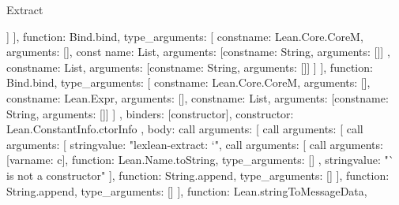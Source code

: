 \begin{lexlean}{Extract}
\begin{toolingmodule}
{{{{{{{{{{{{{{                                        }
                                      ]
                                    }
                                  }
                                ],
                                function: Bind.bind,
                                type_arguments: [
                                  const{name: Lean.Core.CoreM, arguments: []},
                                  const{
                                    name: List,
                                    arguments: [const{name: String, arguments: []}]
                                  },
                                  const{name: List, arguments: [const{name: String, arguments: []}]}
                                ]
                              }
                            }
                          ],
                          function: Bind.bind,
                          type_arguments: [
                            const{name: Lean.Core.CoreM, arguments: []},
                            const{name: Lean.Expr, arguments: []},
                            const{name: List, arguments: [const{name: String, arguments: []}]}
                          ]
                        },
                        binders: [constructor],
                        constructor: Lean.ConstantInfo.ctorInfo
                      },
                      {
                        body: call{
                          arguments: [
                            call{
                              arguments: [
                                call{
                                  arguments: [
                                    string{value: "lexlean-extract: `"},
                                    call{
                                      arguments: [
                                        call{
                                          arguments: [var{name: c}],
                                          function: Lean.Name.toString,
                                          type_arguments: []
                                        },
                                        string{value: "` is not a constructor"}
                                      ],
                                      function: String.append,
                                      type_arguments: []
                                    }
                                  ],
                                  function: String.append,
                                  type_arguments: []
                                }
                              ],
                              function: Lean.stringToMessageData,
}}}}}}}}}}
\end{toolingmodule}
\end{lexlean}
